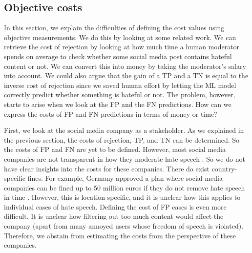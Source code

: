 \subsection{Objective costs}
In this section, we explain the difficulties of defining the cost values using objective measurements. We do this by looking at some related work. We can retrieve the cost of rejection by looking at how much time a human moderator spends on average to check whether some social media post contains hateful content or not. We can convert this into money by taking the moderator's salary into account. We could also argue that the gain of a TP and a TN is equal to the inverse cost of rejection since we saved human effort by letting the ML model correctly predict whether something is hateful or not. The problem, however, starts to arise when we look at the FP and the FN predictions. How can we express the costs of FP and FN predictions in terms of money or time?

First, we look at the social media company as a stakeholder. As we explained in the previous section, the costs of rejection, TP, and TN can be determined. So the costs of FP and FN are yet to be defined. However, most social media companies are not transparent in how they moderate hate speech \citep{klonick2017new}. So we do not have clear insights into the costs for these companies. There do exist country-specific fines. For example, Germany approved a plan where social media companies can be fined up to 50 million euros if they do not remove hate speech in time \citep{bbc-firms-face-fine-germany}. However, this is location-specific, and it is unclear how this applies to individual cases of hate speech. Defining the cost of FP cases is even more difficult. It is unclear how filtering out too much content would affect the company (apart from many annoyed users whose freedom of speech is violated). Therefore, we abstain from estimating the costs from the perspective of these companies.

